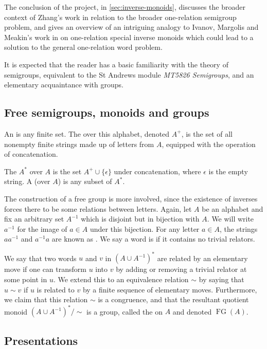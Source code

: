 \documentclass[noindex,noinsetproof,12pt]{lmaths}
\DeclareMathOperator{\FG}{FG}
\begin{document}
The conclusion of the project, in \cref{sec:inverse-monoids}, discusses the broader context of Zhang's work in relation to the broader one-relation semigroup problem, and gives an overview of an intriguing analogy to Ivanov, Margolis and Meakin's work in \cite{Ivanov2001} on one-relation special inverse monoids which could lead to a solution to the general one-relation word problem.

It is expected that the reader has a basic familiarity with the theory of semigroups, equivalent to the St Andrews module \emph{MT5826 Semigroups}, and an elementary acquaintance with groups.

\subsection{Free semigroups, monoids and groups}

An  is any finite set. The  over this alphabet, denoted $A^{+}$, is the set of all nonempty finite strings made up of letters from $A$, equipped with the operation of concatenation.

The  $A^*$ over $A$ is the set $A^+ \cup \{\epsilon\}$ under concatenation, where $\epsilon$ is the empty string. A  (over $A$) is any subset of $A^*$.

The construction of a free group is more involved, since the existence of inverses forces there to be some relations between letters. Again, let $A$ be an alphabet and fix an arbitrary set $A^{-1}$ which is disjoint but in bijection with $A$. We will write $a^{-1}$ for the image of $a \in A$ under this bijection. For any letter $a \in A$, the strings $aa^{-1}$ and $a^{-1}a$ are known as . We say a word is  if it contains no trivial relators.

We say that two words $u$ and $v$ in $(A \cup A^{-1})^*$ are related by an elementary move if one can transform $u$ into $v$ by adding or removing a trivial relator at some point in $u$. We extend this to an equivalence relation $\sim$ by saying that $u \sim v$ if $u$ is related to $v$ by a finite sequence of elementary moves.  Furthermore, we claim that this relation $\sim$ is a congruence, and that the resultant quotient monoid $(A \cup A^{-1})^*/{\sim}$ is a group, called the  on $A$ and denoted $\FG(A)$.

\subsection{Presentations}
\end{document}
